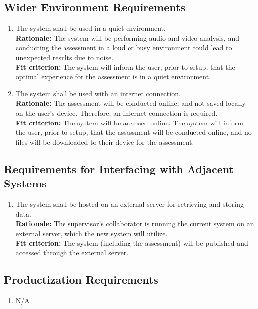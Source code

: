 \documentclass[12pt]{article}
\begin{document}
\subsection{Wider Environment Requirements}
\begin{enumerate}[{OE-WE}1. ]
  \item The system shall be used in a quiet environment.\\
  \textbf{Rationale: }The system will be performing audio and video analysis, and conducting the assessment in a loud or busy environment could lead to unexpected results due to noise.\\
  \textbf{Fit criterion: }The system will inform the user, prior to setup, that the optimal experience for the assessment is in a quiet environment. 
  \item The system shall be used with an internet connection.\\
  \textbf{Rationale: }The assessment will be conducted online, and not saved locally on the user's device. Therefore, an internet connection is required.\\
  \textbf{Fit criterion: }The system will be accessed online. The system will inform the user, prior to setup, that the assessment will be conducted online, and no files will be downloaded to their device for the assessment. 
\end{enumerate}
\subsection{Requirements for Interfacing with Adjacent Systems}
\begin{enumerate}[{OE-IA}1. ]
  \item The system shall be hosted on an external server for retrieving and storing data.\\
  \textbf{Rationale: }The supervisor's collaborator is running the current system on an external server, which the new system will utilize.\\
  \textbf{Fit criterion: }The system (including the assessment) will be published and accessed through the external server.
\end{enumerate}
\subsection{Productization Requirements}
\begin{enumerate}[{OE-PR}1. ]
  \item N/A
\end{enumerate}
\end{document}
